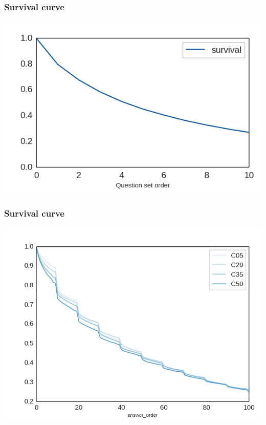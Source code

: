 \documentclass[bigger]{beamer}
\begin{document}
\begin{frame}
  \frametitle{Survival curve}
  \includegraphics[width=\textwidth]{img/survival_curve_grouped}
\end{frame}

\begin{frame}
  \frametitle{Survival curve}
  \includegraphics[width=\textwidth]{img/survival_curve_by_ab}
\end{frame}
\end{document}
